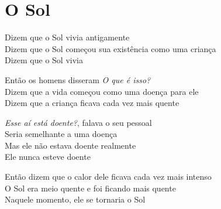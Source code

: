 \chapter{O Sol}

\begin{linenumbers}\begingroup\raggedright
\noindent Dizem que o Sol vivia antigamente\\
Dizem que o Sol começou sua existência como uma criança\\
Dizem que o Sol vivia
\end{linenumbers}\endgroup

\bigskip

\begin{linenumbers}\begingroup\raggedright
\noindent Então os homens disseram \textit{O que é isso?}\\
Dizem que a vida começou como uma doença para ele\\
Dizem que a criança ficava cada vez mais quente
\end{linenumbers}\endgroup

\bigskip

\begin{linenumbers}\begingroup\raggedright
\noindent \textit{Esse aí está doente?}, falava o seu pessoal\\
Seria semelhante a uma doença\\
Mas ele não estava doente realmente\\
Ele nunca esteve doente
\end{linenumbers}\endgroup

\bigskip

\begin{linenumbers}\begingroup\raggedright
\noindent Então dizem que o calor dele ficava cada vez mais intenso\\
O Sol era meio quente e foi ficando mais quente\\
Naquele momento, ele se tornaria o Sol
\end{linenumbers}\endgroup

